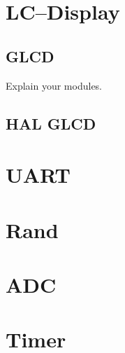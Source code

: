 \documentclass[12pt,a4paper,titlepage,oneside]{article}
\begin{document}
\section{LC--Display}

\subsection{GLCD}

Explain your modules.

\subsection{HAL GLCD}

\section{UART}

\section{Rand}

\section{ADC}

\section{Timer}
\end{document}
